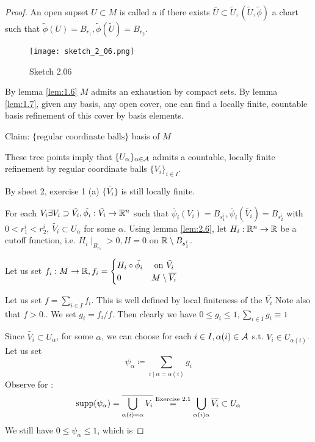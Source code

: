 \begin{proof}
     An open supset \(U\subset M\) is called a  if there 
    exists \(\overline{U}\subset\tilde{U},(\tilde{U},\tilde{\phi})\) a chart such that 
    \(\tilde{\phi}(U)=B_{r_1},\tilde{\phi}(\tilde{U})=B_{r_2}\). 
    \begin{figure}[H]
        \centering
        \texttt{[image: sketch\_2\_06.png]}
        \caption{Sketch 2.06}
    \end{figure}
    By lemma \ref{lem:1.6} \(M\) admits an exhaustion by compact sets. By lemma \ref{lem:1.7}, given 
    any basis, any open cover, one can find a locally finite, countable basis refinement of this cover by basis elements.

    Claim: \(\{\text{regular coordinate balls}\}\) basis of \(M\) 

    These tree points imply that \(\{U_\alpha\}_{\alpha\in\mathcal{A}}\) admits a countable, locally finite refinement by regular coordinate balls \(\{V_i\}_{i\in I}\).

    By sheet 2, exercise 1 (a) \(\{\overline{V_i}\}\) is still locally finite.

     For each \(V_i\exists V_i\supset \tilde{V_i},\tilde{\phi_i}:\tilde{V_i}\to \mathbb{R}^n\) such that 
    \(\tilde{\psi_i}(V_i)=B_{s_1^i},\tilde{\psi_i}(\tilde{V_i})=B_{s_2^i}\) with \(0<r_1^i<r_2^i\), \(\tilde{V_i}\subset U_\alpha\) for some \(\alpha\).
    Using lemma \ref{lem:2.6}, let \(H_i:\mathbb{R}^n\to \mathbb{R}\) be a cutoff function, i.e. \(H_i\mid_{{B_{r_1}}}>0,H=0\) on \(\mathbb{R}\setminus B_{s_1^i}\).

    Let us set \(f_i:M\to\mathbb{R}, f_i=\begin{cases}
        H_i\circ \tilde{\phi_i} & \text{ on } \tilde{V_i}\\
        0 & M\setminus \overline{{V_i}}
    \end{cases}\)

     Let us set \(f=\sum_{i\in I} f_i\). This is well defined by local finiteness of the \(\overline{V_i}\) Note also that \(f>0\)..
    We set \(g_i=f_i/f\). Then clearly we have \(0\leq g_i\leq 1, \sum_{i\in I} g_i\equiv 1\)

     Since \(\tilde{V_i}\subset U_\alpha\), for some \(\alpha\), we can choose for each \(i\in I, \alpha(i)\in \mathcal{A}\) s.t. \(V_i\in U_{\alpha(i)}\).
    Let us set \[\psi_{\alpha}\coloneqq \sum_{i\mid \alpha=\alpha(i)}g_i\]
    Observe for : \[\text{supp}(\psi_\alpha)=\overline{\bigcup_{\alpha(i)=\alpha} V_i}\stackrel{\text{Exercise 2.1}}{=}\bigcup_{\alpha(i)\alpha}\overline{V_i}\subset U_\alpha\]
    We still have \(0\leq \psi_\alpha\leq 1\), which is 
    

\end{proof}
